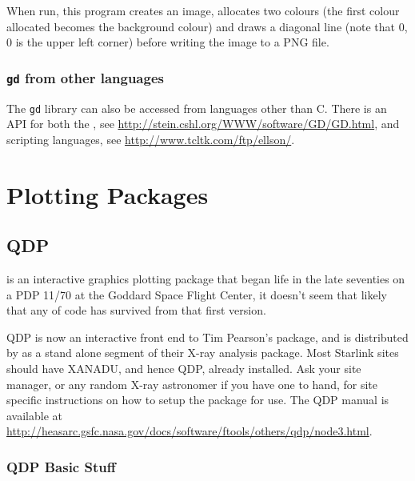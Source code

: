 \documentclass[twoside,11pt]{starlink}
\begin{document}
When run, this program creates an image, allocates two colours (the
first colour allocated becomes the background colour) and draws a
diagonal line (note that 0, 0 is the upper left corner) before writing
the image to a PNG file.

\subsubsection{\texttt{gd} from other languages}

The \texttt{gd} library can also be accessed from languages other than C.
There is an API for both the
,
see \url{http://stein.cshl.org/WWW/software/GD/GD.html}, and
 scripting
languages, see \url{http://www.tcltk.com/ftp/ellson/}.

\section{Plotting Packages\label{sc15_packages}}

\subsection{QDP\label{sc15_qdp}}

is an interactive graphics plotting package that began life in the
late seventies on a PDP 11/70 at the Goddard Space Flight Center, it
doesn't seem that likely that any of code has survived from that first
version.

QDP is now an interactive front end to Tim Pearson's
 package, and is distributed by
 as a stand
alone segment of their
X-ray analysis package. Most Starlink sites should have XANADU, and
hence QDP, already installed. Ask your site manager, or any random
X-ray astronomer if you have one to hand, for site specific
instructions on how to setup the package for use. The QDP manual is
available 
at \url{http://heasarc.gsfc.nasa.gov/docs/software/ftools/others/qdp/node3.html}.

\subsubsection{QDP Basic Stuff}
\end{document}
